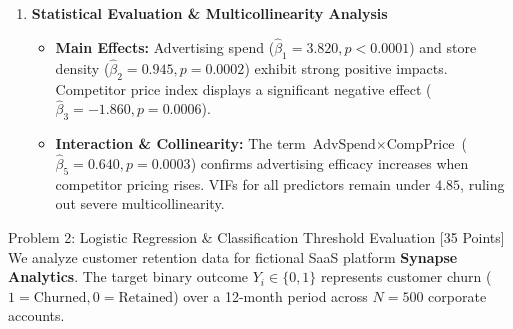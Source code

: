 \documentclass[11pt,a4paper]{scrartcl}
\begin{document}
\begin{enumerate}
\begin{center}
  \end{center}

  \item \textbf{Statistical Evaluation \& Multicollinearity Analysis}

  \begin{statbox}
    \begin{itemize}
      \item \textbf{Main Effects:} Advertising spend ($\hat{\beta}_1 = 3.820, p < 0.0001$) and store density ($\hat{\beta}_2 = 0.945, p = 0.0002$) exhibit strong positive impacts. Competitor price index displays a significant negative effect ($\hat{\beta}_3 = -1.860, p = 0.0006$).
      \item \textbf{Interaction \& Collinearity:} The term $\text{AdvSpend} \times \text{CompPrice}$ ($\hat{\beta}_5 = 0.640, p = 0.0003$) confirms advertising efficacy increases when competitor pricing rises. VIFs for all predictors remain under $4.85$, ruling out severe multicollinearity.
    \end{itemize}
  \end{statbox}
\end{enumerate}

\clearpage

\begin{problembox}{Problem 2: Logistic Regression \& Classification Threshold Evaluation [35 Points]}
We analyze customer retention data for fictional SaaS platform \textbf{Synapse Analytics}. The target binary outcome $Y_i \in \{0, 1\}$ represents customer churn ($1 = \text{Churned}, 0 = \text{Retained}$) over a 12-month period across $N = 500$ corporate accounts.
\end{problembox}
\end{document}
